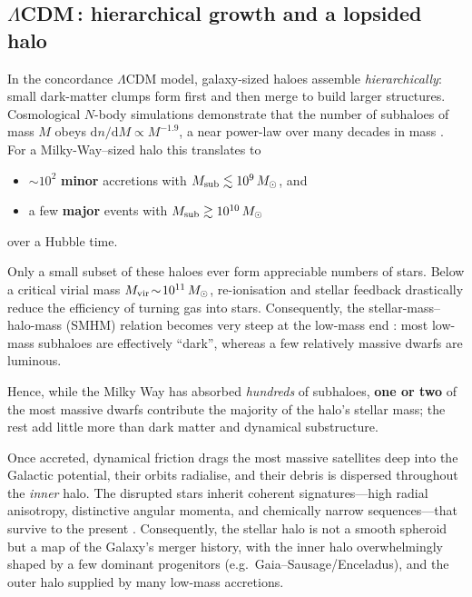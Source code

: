 \documentclass[a4paper,12pt]{article}
\begin{document}
\subsection{$\Lambda$CDM\,{\rm :} hierarchical growth and a lopsided halo}
\label{subsec:LCDM_halo}

In the concordance $\Lambda$CDM model, galaxy-sized haloes assemble \emph{hierarchically}:  
small dark-matter clumps form first and then merge to build larger structures.  
Cosmological $N$-body simulations demonstrate that the number of subhaloes of mass $M$ obeys  
$\mathrm{d}n/\mathrm{d}M \propto M^{-1.9}$, a near power-law over many decades in mass  
\citep{Cooper2010,Fall2012}.  
For a Milky-Way–sized halo this translates to  
\begin{itemize}
    \item ${\sim}10^{2}$ \textbf{minor} accretions with $M_{\rm sub}\lesssim10^{9}\,M_\odot$, and 
    \item a few \textbf{major} events with $M_{\rm sub}\gtrsim10^{10}\,M_\odot$
\end{itemize}
over a Hubble time.  

Only a small subset of these haloes ever form appreciable numbers of stars.  
Below a critical virial mass $M_{\rm vir}\!\sim\!10^{11}\,M_\odot$, re-ionisation and stellar feedback
drastically reduce the efficiency of turning gas into stars.  
Consequently, the stellar-mass–halo-mass (SMHM) relation becomes very steep at the low-mass end  
\citep{Purcell2007,BullockBoylanKolchin2017}:  
most low-mass subhaloes are effectively ``dark'', whereas a few relatively massive dwarfs are luminous.  

Hence, while the Milky Way has absorbed \emph{hundreds} of subhaloes,  
\textbf{one or two} of the most massive dwarfs contribute the majority of the halo’s stellar mass;  
the rest add little more than dark matter and dynamical substructure.  
 

Once accreted, dynamical friction drags the most massive satellites deep into the Galactic potential,  
their orbits radialise, and their debris is dispersed throughout the \emph{inner} halo.  
The disrupted stars inherit coherent signatures—high radial anisotropy,  
distinctive angular momenta, and chemically narrow sequences—that survive to the present 
\citep[e.g.][]{HelmiDeZeeuw2000}.  
Consequently, the stellar halo is not a smooth spheroid but a map of the Galaxy’s merger history, 
with the inner halo overwhelmingly shaped by a few dominant progenitors (e.g.\ Gaia–Sausage/Enceladus), 
and the outer halo supplied by many low-mass accretions.
\end{document}
